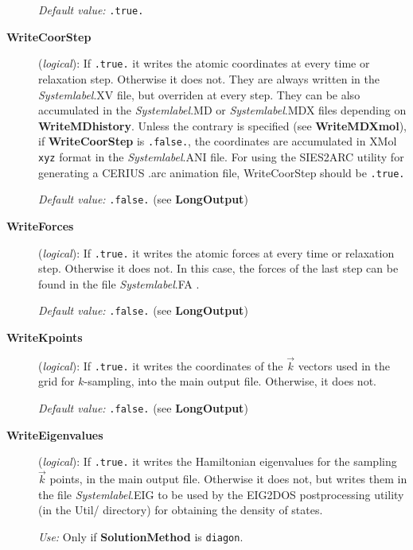 \documentclass[11pt]{article}
\begin{document}
\begin{description}
{\it Default value:} {\tt .true.}

 
\item[{\bf WriteCoorStep}] ({\it logical}):
If {\tt .true.} it writes the atomic coordinates at every 
time or relaxation step. Otherwise it does not. They are
always written in the {\it Systemlabel}.XV file, but
overriden at every step. They can be also accumulated
in the {\it Systemlabel}.MD or {\it Systemlabel}.MDX files
depending on {\bf WriteMDhistory}. Unless the contrary is specified
(see {\bf WriteMDXmol}), if {\bf WriteCoorStep} is {\tt .false.}, 
the coordinates are accumulated in {\sc XMol} {\tt xyz} format in the
{\it Systemlabel}.ANI file.
For using the SIES2ARC utility
for generating a CERIUS .arc animation file,
WriteCoorStep should be {\tt .true.}

{\it Default value:} {\tt .false.} (see {\bf LongOutput})
 
 
\item[{\bf WriteForces}] ({\it logical}):
If {\tt .true.} it writes the atomic forces at every
time or relaxation step. Otherwise it does not. In this case,
the forces of the last step can be found in the file {\it Systemlabel}.FA .
 
{\it Default value:} {\tt .false.} (see {\bf LongOutput})

\item[{\bf WriteKpoints}] ({\it logical}):
If {\tt .true.} it writes the coordinates of the $\vec k$ vectors
used in the grid for $k$-sampling, into the main output file.
Otherwise, it does not.

{\it Default value:} {\tt .false.} (see {\bf LongOutput})

 
\item[{\bf WriteEigenvalues}] ({\it logical}):
If {\tt .true.} it writes the Hamiltonian eigenvalues for the sampling
$\vec k$ points, in the main output file.
Otherwise it does not, but writes them in the file {\it Systemlabel}.EIG
to be used by the EIG2DOS postprocessing utility 
(in the Util/ directory) for obtaining the density of
states.

{\it Use:} Only if {\bf SolutionMethod} is {\tt diagon}.
 

\end{description}
\end{document}
